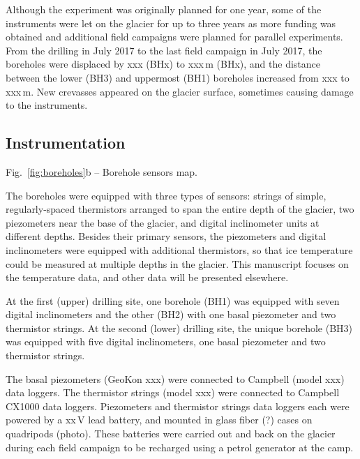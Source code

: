 \documentclass[utf8]{article}
\begin{document}
    Although the experiment was originally planned for one year, some of the
    instruments were let on the glacier for up to three years as more funding
    was obtained and additional field campaigns were planned for parallel
    experiments. From the drilling in July 2017 to the last field campaign in
    July 2017, the boreholes were displaced by xxx (BHx) to xxx\,m (BHx), and
    the distance between the lower (BH3) and uppermost (BH1) boreholes
    increased from xxx to xxx\,m. New crevasses appeared on the glacier
    surface, sometimes causing damage to the instruments.


\subsection{Instrumentation}

    Fig.~\ref{fig:boreholes}b -- Borehole sensors map.

    The boreholes were equipped with three types of sensors: strings of simple,
    regularly-spaced thermistors arranged to span the entire depth of the
    glacier, two piezometers near the base of the glacier, and digital
    inclinometer units at different depths. Besides their primary sensors, the
    piezometers and digital inclinometers were equipped with additional
    thermistors, so that ice temperature could be measured at multiple depths
    in the glacier. This manuscript focuses on the temperature data, and other
    data will be presented elsewhere.

    At the first (upper) drilling site, one borehole (BH1) was equipped with
    seven digital inclinometers and the other (BH2) with one basal piezometer
    and two thermistor strings. At the second (lower) drilling site, the unique
    borehole (BH3) was equipped with five digital inclinometers, one basal
    piezometer and two thermistor strings.

    The basal piezometers (GeoKon xxx) were connected to Campbell (model xxx)
    data loggers. The thermistor strings (model xxx) were connected to
    Campbell CX1000 data loggers. Piezometers and thermistor strings data
    loggers each were powered by a xx\,V lead battery, and mounted in glass
    fiber (?) cases on quadripods (photo). These batteries were carried out and
    back on the glacier during each field campaign to be recharged using a
    petrol generator at the camp.
\end{document}
